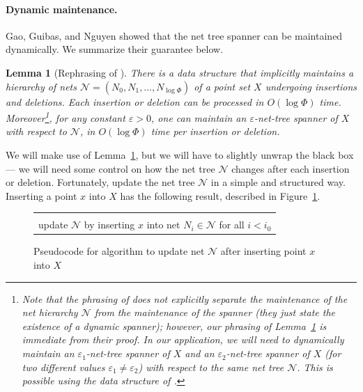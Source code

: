 \documentclass[11pt]{article}
\makeatletter
\let\e\varepsilon               %
\def\begin@lgo{\begin{minipage}{1in}\small\begin{tabbing}
        \quad\=\qquad\=\qquad\=\qquad\=\qquad\=\qquad\=\qquad\=\qquad\=\qquad\=\qquad\=\qquad\=\qquad\=\qquad\=\kill}
\def\end@lgo{\end{tabbing}\end{minipage}}
\newenvironment{algorithm}
{\begin{tabular}{|l|}\hline\begin@lgo}
{\end@lgo\\\hline\end{tabular}}
\newtheorem{lemma}[theorem]{Lemma}
\newcommand{\cN}{\mathcal{N}}
\newcommand{\dist}{\ensuremath{\delta}}
\makeatother
\begin{document}
\paragraph{Dynamic maintenance.}
Gao, Guibas, and Nguyen \cite{gao2004deformable} showed that the net tree spanner can be maintained dynamically. We summarize their guarantee below.
\begin{lemma}[Rephrasing of {\cite[Theorem 4.2]{gao2004deformable}}]
\label{lem:deformable}
    There is a data structure that implicitly maintains a hierarchy of nets $\mathcal{N}=(N_0, N_1, \ldots, N_{\log \Phi})$ of a point set $X$ undergoing insertions and deletions. Each insertion or deletion can be processed in $O(\log \Phi)$ time.
% 
    Moreover\footnote{Note that the phrasing of \cite[Theorem 4.2]{gao2004deformable} does not explicitly separate the maintenance of the net hierarchy $\cN$ from the maintenance of the spanner (they just state the existence of a dynamic spanner); however, our phrasing of Lemma~\ref{lem:deformable} is immediate from their proof. In our application, we will need to dynamically maintain an $\e_1$-net-tree spanner of $X$ and an $\e_2$-net-tree spanner of $X$ (for two different values $\e_1 \neq \e_2$) \emph{with respect to the same net tree $\cN$}. This is possible using the data structure of \cite{gao2004deformable}.}, for any constant $\e > 0$, one can maintain an $\e$-net-tree spanner of $X$ with respect to $\mathcal{N}$, in $O(\log \Phi)$ time per insertion or deletion.
\end{lemma}
We will make use of Lemma~\ref{lem:deformable}, but we will have to slightly unwrap the black box --- we will need some control on how the net tree $\cN$ changes after each insertion or deletion. Fortunately, \cite{gao2004deformable} update the net tree $\mathcal{N}$ in a simple and structured way. Inserting a point $x$ into $X$ has the following result, described in Figure~\ref{fig:sparse-insert}.
\begin{figure}[h!]
    \centering
    \begin{algorithm}
    $i_0 \gets$ smallest scale such that the scale-$i_0$ net $N_{i_0} \in \cN$ satisfies $\dist(x, N_{i_0}) < 2^{i_0}$
    \\ update $\cN$ by inserting $x$ into net $N_i \in \cN$ for all $i < i_0$
    \end{algorithm}
    \caption{Pseudocode for \cite{gao2004deformable} algorithm to update net $\mathcal{N}$ after inserting point $x$ into $X$}
    \label{fig:sparse-insert}
\end{figure}
\end{document}
